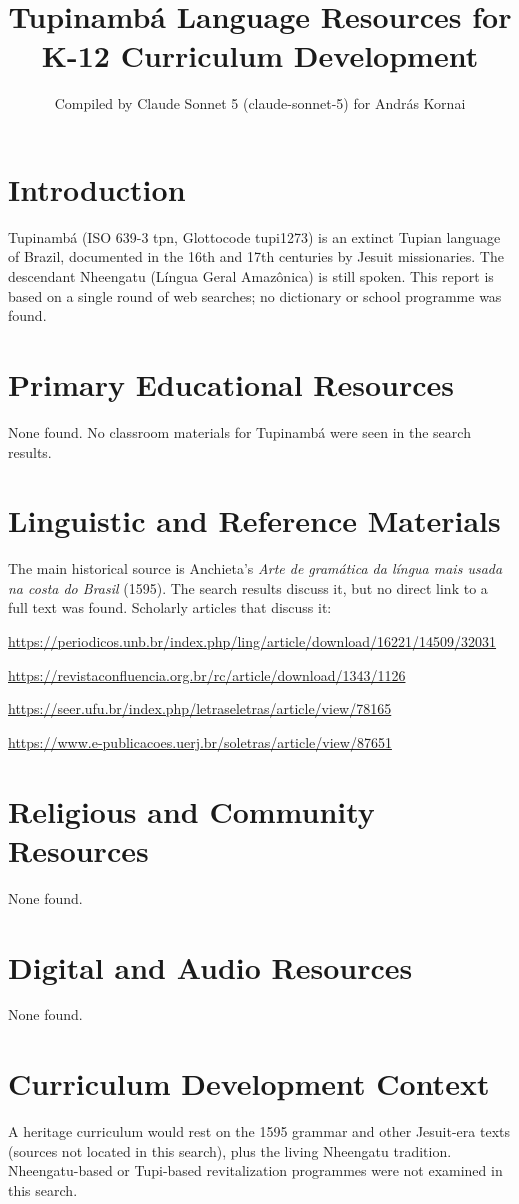 \documentclass[12pt]{article}
\title{Tupinamb\'a Language Resources for K-12 Curriculum Development}
\author{Compiled by Claude Sonnet 5 (claude-sonnet-5) for Andr\'as Kornai}
\date{}
\begin{document}
\maketitle
\section{Introduction}
Tupinamb\'a (ISO 639-3 tpn, Glottocode tupi1273) is an extinct Tupian language of Brazil, documented in the 16th and 17th centuries by Jesuit missionaries. The descendant Nheengatu (L\'ingua Geral Amaz\^onica) is still spoken. This report is based on a single round of web searches; no dictionary or school programme was found.
\section{Primary Educational Resources}
None found. No classroom materials for Tupinamb\'a were seen in the search results.
\section{Linguistic and Reference Materials}
The main historical source is Anchieta's \emph{Arte de gram\'atica da l\'ingua mais usada na costa do Brasil} (1595). The search results discuss it, but no direct link to a full text was found. Scholarly articles that discuss it:

\url{https://periodicos.unb.br/index.php/ling/article/download/16221/14509/32031}

\url{https://revistaconfluencia.org.br/rc/article/download/1343/1126}

\url{https://seer.ufu.br/index.php/letraseletras/article/view/78165}

\url{https://www.e-publicacoes.uerj.br/soletras/article/view/87651}
\section{Religious and Community Resources}
None found.
\section{Digital and Audio Resources}
None found.
\section{Curriculum Development Context}
A heritage curriculum would rest on the 1595 grammar and other Jesuit-era texts (sources not located in this search), plus the living Nheengatu tradition. Nheengatu-based or Tupi-based revitalization programmes were not examined in this search.
\end{document}
